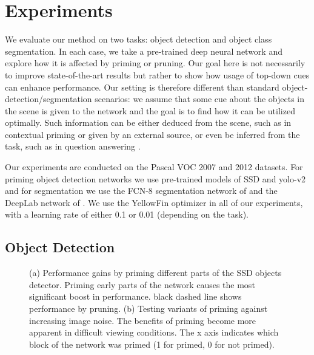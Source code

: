 \documentclass[10pt,letterpaper,twocolumn]{article}
\begin{document}
\section{Experiments\label{sec:Experiments}}

We evaluate our method on two tasks: object detection and object class
segmentation. In each case, we take a pre-trained deep neural network
and explore how it is affected by priming or pruning. Our goal here
is not necessarily to improve state-of-the-art results but rather
to show how usage of top-down cues can enhance performance. Our setting
is therefore different than standard object-detection/segmentation
scenarios: we assume that some cue about the objects in the scene
is given to the network and the goal is to find how it can be utilized
optimally. Such information can be either deduced from the scene,
such as in contextual priming \cite{shrivastava2016contextual,katti2016object}
or given by an external source, or even be inferred from the task,
such as in question answering \cite{antol2015vqa,johnson2016clevr}. 

Our experiments are conducted on the Pascal VOC \cite{everingham2010pascal}
2007 and 2012 datasets. For priming object detection networks we use
pre-trained models of SSD \cite{liu2016ssd} and yolo-v2 \cite{redmon2016yolo9000}
and for segmentation we use the FCN-8 segmentation network of \cite{long2015fully}
and the DeepLab network of \cite{chen2016deeplab}. We use the YellowFin
optimizer \cite{zhang2017yellowfin} in all of our experiments, with
a learning rate of either 0.1 or 0.01 (depending on the task). 

\subsection{Object Detection\label{subsec:Object-Detection}}

\begin{figure}
\centering{}\caption{(a) \label{fig:h-and-noise}Performance gains by priming different
parts of the SSD objects detector. Priming early parts of the network
causes the most significant boost in performance. black dashed line
shows performance by pruning. (b) Testing variants of priming against
increasing image noise. The benefits of priming become more apparent
in difficult viewing conditions. The x axis indicates which block
of the network was primed (1 for primed, 0 for not primed). }
\end{figure}
\end{document}

